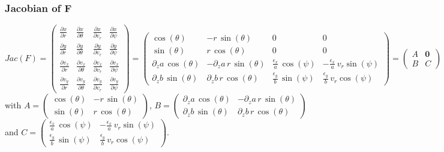 \documentclass[10pt]{article}
\newcommand{\D}{{\partial}}
\begin{document}
\subsubsection{Jacobian of F}


$$
\displaystyle Jac(F) = \displaystyle
  \left( \begin{array}{cccc}
    \frac{\D x}{\D r} & \frac{\D x}{\D \theta} & \frac{\D x}{\D v_r} &  \frac{\D x}{\D \psi} \\
    \frac{\D y}{\D r} & \frac{\D y}{\D \theta} & \frac{\D y}{\D v_r} &  \frac{\D y}{\D \psi} \\
    \frac{\D v_x}{\D r} & \frac{\D v_x}{\D \theta} & \frac{\D v_x}{\D v_r} &  \frac{\D v_x}{\D \psi} \\
    \frac{\D v_y}{\D r} & \frac{\D v_y}{\D \theta} & \frac{\D v_y}{\D v_r} &  \frac{\D v_y}{\D \psi}

  \end{array} \right) = \displaystyle
  \left( \begin{array}{cc|cc}
    \cos(\theta) & - r\,\sin(\theta) & 0 & 0 \\
    \sin(\theta) & r\,\cos(\theta) & 0 &  0 \\ \hline
    \D_{z} a\,\cos(\theta) & - \D_{z} a\,r\,\sin(\theta) & \frac{\epsilon_{x}}{a}\,\cos(\psi) &  - \frac{\epsilon_{x}}{a}\,v_r\sin(\psi) \\
    \D_{z} b\,\sin(\theta) & \D_{z} b\,r\,\cos(\theta) & \frac{\epsilon_{y}}{b}\,\sin(\psi) & \frac{\epsilon_{y}}{b}\,v_r\cos(\psi)

  \end{array} \right) = \displaystyle
  \left( \begin{array}{c|c}
    A & \mathbf{0} \\ \hline
    B &  C 
  \end{array} \right)
$$
with $A = \left( \begin{array}{cc}
    \cos(\theta) & - r\,\sin(\theta) \\
    \sin(\theta) & r\,\cos(\theta) 
    \end{array} \right)$, 
    $B = \left( \begin{array}{cc}
    \D_{z} a\,\cos(\theta) & - \D_{z} a\,r\,\sin(\theta) \\
    \D_{z} b\,\sin(\theta) & \D_{z} b\,r\,\cos(\theta)
    \end{array} \right)$ and 
    $C = \left( \begin{array}{cc}
    \frac{\epsilon_{x}}{a}\,\cos(\psi) &  - \frac{\epsilon_{x}}{a}\,v_r\sin(\psi) \\
    \frac{\epsilon_{y}}{b}\,\sin(\psi) &  \frac{\epsilon_{y}}{b}\,v_r\cos(\psi)
   \end{array} \right)$. \\
\end{document}
